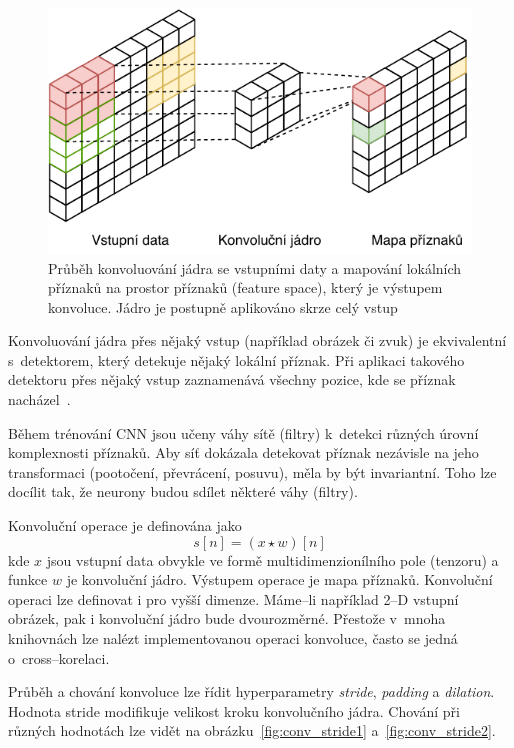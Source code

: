 \begin{figure}[H]
    \centering
    \includegraphics[scale=1.0]{obrazky-figures/convmapping.pdf}
    \caption{\label{fig:convmapping}Průběh konvoluování jádra se vstupními daty a mapování lokálních příznaků na prostor příznaků (feature space), který je výstupem konvoluce. Jádro je postupně aplikováno skrze celý vstup}
\end{figure}

Konvoluování jádra přes nějaký vstup (například obrázek či zvuk) je ekvivalentní s~detektorem, který detekuje nějaký lokální příznak. Při aplikaci takového detektoru přes nějaký vstup zaznamenává všechny pozice, kde se příznak nacházel~\cite{mitdeeplearning_small}.

Během trénování CNN jsou učeny váhy sítě (filtry) k~detekci různých úrovní komplexnosti příznaků. Aby síť dokázala detekovat příznak nezávisle na jeho transformaci (pootočení, převrácení, posuvu), měla by být invariantní. Toho lze docílit tak, že neurony budou sdílet některé váhy (filtry).


Konvoluční operace je definována jako
\begin{equation}
   s[n] = (x \star w)[n]
\end{equation}
kde $x$ jsou vstupní data obvykle ve formě multidimenzionílního pole (tenzoru) a funkce $w$ je konvoluční jádro. Výstupem operace je mapa příznaků. Konvoluční operaci lze definovat i pro vyšší dimenze. Máme--li například 2--D vstupní obrázek, pak i konvoluční jádro bude dvourozměrné. Přestože v~mnoha knihovnách lze nalézt implementovanou operaci konvoluce, často se jedná o~cross--korelaci.


Průběh a chování konvoluce lze řídit hyperparametry \textit{stride}, \textit{padding} a \textit{dilation}. Hodnota stride modifikuje velikost kroku konvolučního jádra. Chování při různých hodnotách lze vidět na obrázku~\ref{fig:conv_stride1} a~\ref{fig:conv_stride2}. 

